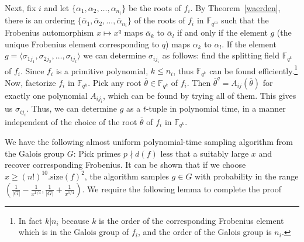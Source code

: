 \documentclass{article}
\newcommand{\F}[0]{\ensuremath{\mathbb{F}}}
\newcommand{\size}[0]{\ensuremath{\mathrm{size}}}
\renewcommand{\angle}[1]{\langle #1\rangle}
\begin{document}
Next, fix $i$ and let $\{\alpha_1,\alpha_2,\ldots,\alpha_{n_i}\}$ be
the roots of $f_i$.  By Theorem~\ref{waerden}, there is an ordering
$\{\overline{\alpha}_1,\overline{\alpha}_2,\ldots,\overline{\alpha}_{n_i}\}$
of the roots of $f_i$ in $\F_{q^m}$ such that the Frobenius
automorphism $x\mapsto x^q$ maps $\overline{\alpha}_k$ to
$\overline{\alpha}_l$ if and only if the element $g$ (the unique
Frobenius element corresponding to $q$) maps $\alpha_k$ to $\alpha_l$.
If the element
$g=\angle{\sigma_{1j_1},\sigma_{2j_2},\ldots,\sigma_{tj_t}}$ we can
determine $\sigma_{ij_i}$ as follows: find the splitting field
$\F_{q^k}$ of $f_i$. Since $f_i$ is a primitive polynomial, $k \leq
n_i$, thus $\F_{q^k}$ can be found efficiently.\footnote{ In fact $k
  |n_i$ because $k$ is the order of the corresponding Frobenius
  element which is in the Galois group of $f_i$, and the order of the
  Galois group is $n_i$.}  Now, factorize $f_i$ in $\F_{q^k}$.  Pick
any root $\overline{\theta}\in\F_{q^k}$ of $f_i$.  Then
$\overline{\theta}^q=A_{ij}(\overline{\theta})$ for exactly one
polynomial $A_{ij_i}$, which can be found by trying all of them.  This
gives us $\sigma_{ij_i}$. Thus, we can determine $g$ as a $t$-tuple in
polynomial time, in a manner independent of the choice of the root
$\overline{\theta}$ of $f_i$ in $\F_{q^k}$.

We have the following almost uniform polynomial-time sampling
algorithm from the Galois group $G$: Pick primes $p \nmid d(f)$ less
that a suitably large $x$ and recover corresponding Frobenius.  It can
be shown that if we choose $x \geq (n!)^{10}.\size(f)^2$, the
algorithm samples $g\in G$ with probability in the range
\mbox{$\left(\frac{1}{|G|}-\frac{1}{x^{1/4}},\frac{1}{|G|}+\frac{1}{x^{1/4}}\right)$}.
We require the following lemma to complete the proof
\end{document}
